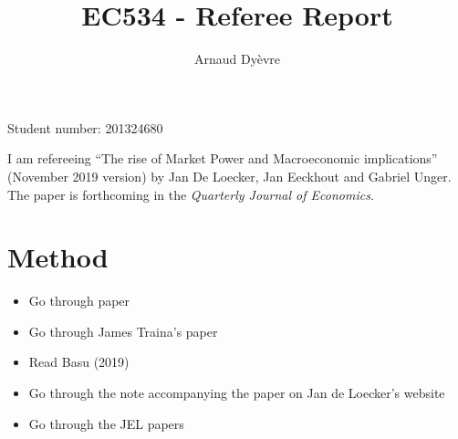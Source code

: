 \documentclass{amsart}
\theoremstyle{definition}
\theoremstyle{remark}
\numberwithin{equation}{section}
\begin{document}
\title{EC534 - Referee Report}

\author{Arnaud Dy\`evre}







\maketitle

\begin{center}
Student number: 201324680
\end{center}


\vspace{12pt}

I am refereeing ``The rise of Market Power and Macroeconomic implications'' (November 2019 version) by Jan De Loecker, Jan Eeckhout and Gabriel Unger. The paper is forthcoming in the \textit{Quarterly Journal of Economics}.

\newpage 

\section{Method}

\begin{itemize}
    \item Go through paper
    \item Go through James Traina's paper
    \item Read Basu (2019)
    \item Go through the note accompanying the paper on Jan de Loecker's website
    \item Go through the JEL papers
\end{itemize}
\end{document}
